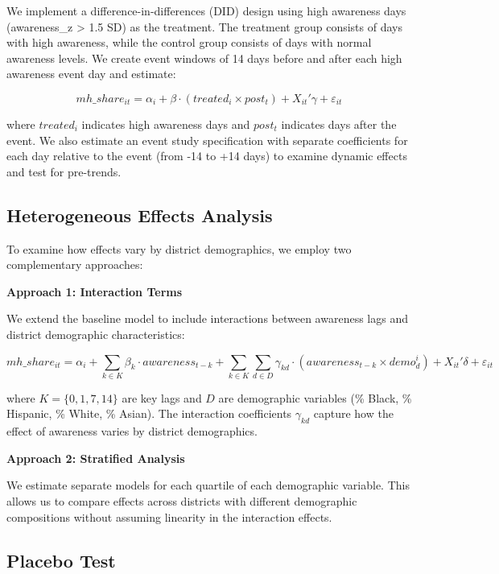 \documentclass[11pt,a4paper]{article}
\begin{document}
We implement a difference-in-differences (DID) design using high awareness days (awareness_z > 1.5 SD) as the treatment. The treatment group consists of days with high awareness, while the control group consists of days with normal awareness levels. We create event windows of 14 days before and after each high awareness event day and estimate:

\begin{equation}
mh\_share_{it} = \alpha_i + \beta \cdot (treated_i \times post_t) + X_{it}' \gamma + \varepsilon_{it}
\end{equation}

where $treated_i$ indicates high awareness days and $post_t$ indicates days after the event. We also estimate an event study specification with separate coefficients for each day relative to the event (from -14 to +14 days) to examine dynamic effects and test for pre-trends.

\subsection{Heterogeneous Effects Analysis}

To examine how effects vary by district demographics, we employ two complementary approaches:

\textbf{Approach 1: Interaction Terms}

We extend the baseline model to include interactions between awareness lags and district demographic characteristics:

\begin{equation}
mh\_share_{it} = \alpha_i + \sum_{k \in K} \beta_k \cdot awareness_{t-k} + \sum_{k \in K} \sum_{d \in D} \gamma_{kd} \cdot (awareness_{t-k} \times demo_d^i) + X_{it}' \delta + \varepsilon_{it}
\end{equation}

where $K = \{0, 1, 7, 14\}$ are key lags and $D$ are demographic variables (\% Black, \% Hispanic, \% White, \% Asian). The interaction coefficients $\gamma_{kd}$ capture how the effect of awareness varies by district demographics.

\textbf{Approach 2: Stratified Analysis}

We estimate separate models for each quartile of each demographic variable. This allows us to compare effects across districts with different demographic compositions without assuming linearity in the interaction effects.

\subsection{Placebo Test}
\end{document}
